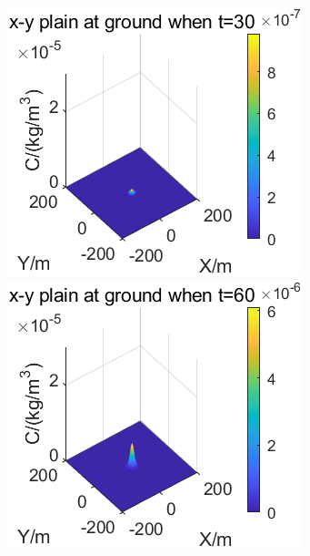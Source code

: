 \documentclass{article}
\begin{document}
	\begin{figure}[htbp]
		\begin{minipage}{0.33\textwidth}
			\includegraphics[width=\textwidth]{pics/v=0.1,t=30.png}
		\end{minipage}
		\begin{minipage}{0.33\textwidth}
			\includegraphics[width=\textwidth]{pics/v=0.1,t=60.png}

\end{minipage}
\end{figure}
\end{document}
